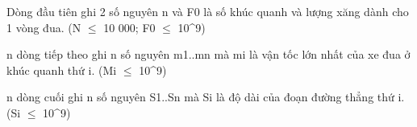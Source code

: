 Dòng đầu tiên ghi 2 số nguyên n và F0 là số khúc quanh và lượng xăng dành cho 1 vòng đua. (N $\le$ 10 000; F0 $\le$ 10^9)

n dòng tiếp theo ghi n số nguyên m1..mn mà mi là vận tốc lớn nhất của xe đua ở khúc quanh thứ i. (Mi $\le$ 10^9)

n dòng cuối ghi n số nguyên S1..Sn mà Si là độ dài của đoạn đường thẳng thứ i. (Si $\le$ 10^9)

\